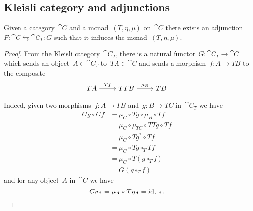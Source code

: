 \documentclass[../TFG.tex]{subfiles}
\begin{document}
\subsection{Kleisli category and adjunctions}
\begin{theorem}
    Given a category~\(\cat{C}\) and a monad~\((T,\eta,\mu)\) on~\(\cat{C}\)
    there exists an adjunction~\(F:\cat{C}\leftrightarrows\cat{C}_{T}:G\)
    such that it induces the monad~\((T,\eta,\mu)\).
\end{theorem}
\begin{proof}
    From the Kleisli category~\(\cat{C}_{T}\), there is a natural
    functor~\(G:\cat{C}_{T}\longrightarrow\cat{C}\) which sends an
    object~\(A\in\cat{C}_{T}\) to~\(TA\in\cat{C}\) and sends a
    morphism~\(f:A\longrightarrow TB\) to the composite
    \[\begin{tikzcd}
        TA \ar[r, "Tf"] & TTB \ar[r, "\mu_{B}"] & TB
    \end{tikzcd}\]

    Indeed, given two morphisms~\(f:A\longrightarrow TB\)
    and~\(g:B\longrightarrow TC\) in~\(\cat{C}_{T}\) we have
    \begin{align*}
        Gg \circ Gf
            &= \mu_{C} \circ Tg \circ \mu_{B} \circ Tf \\
            &= \mu_{C} \circ \mu_{TC} \circ TTg \circ Tf \\
            &= \mu_{C} \circ Tg^{\ast} \circ Tf \\
            &= \mu_{C} \circ Tg \circ_{T} Tf \\
            &= \mu_{C} \circ T(g \circ_{T} f) \\
            &= G(g \circ_{T} f)
    \end{align*}
    and for any object~\(A\) in~\(\cat{C}\) we have
    \[
        G\eta_{A} = \mu_{A} \circ T\eta_{A} = \mathrm{id}_{TA}.
    \]





\end{proof}
\end{document}
